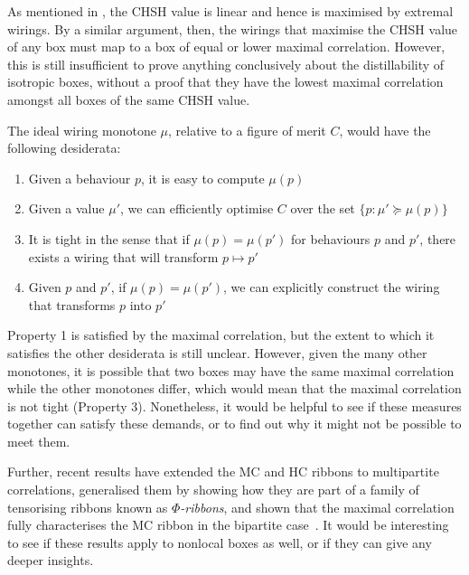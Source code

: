 \documentclass[10pt, a4paper]{article}
\numberwithin{equation}{section} %
\theoremstyle{definition}
\theoremstyle{plain}
\newcommand{\st}{\mathrel{:}} %
\newcommand{\?}{\mathrel{?}} %
\begin{document}

                        As mentioned in , the CHSH value is linear and hence is maximised by extremal wirings. By a similar argument, then, the wirings that maximise the CHSH value of any box must map to a box of equal or lower maximal correlation. However, this is still insufficient to prove anything conclusively about the distillability of isotropic boxes, without a proof that they have the lowest maximal correlation amongst all boxes of the same CHSH value.

                        The ideal wiring monotone \(\mu\), relative to a figure of merit \(C\), would have the following desiderata:
                        \begin{enumerate}
                          \item Given a behaviour \(p\), it is easy to compute \(\mu(p)\)
                          \item Given a value \(\mu'\), we can efficiently optimise \(C\) over the set \(\{ p \st \mu' \succeq \mu(p) \}\)
                          \item It is tight in the sense that if \(\mu(p) = \mu(p')\) for behaviours \(p\) and \(p'\), there exists a wiring that will transform \(p \mapsto p'\)
                          \item Given \(p\) and \(p'\), if \(\mu(p) = \mu(p')\), we can explicitly construct the wiring that transforms \(p\) into \(p'\)
                        \end{enumerate}

                        Property 1 is satisfied by the maximal correlation, but the extent to which it satisfies the other desiderata is still unclear. However, given the many other monotones, it is possible that two boxes may have the same maximal correlation while the other monotones differ, which would mean that the maximal correlation is not tight (Property 3). Nonetheless, it would be helpful to see if these measures together can satisfy these demands, or to find out why it might not be possible to meet them.

                        Further, recent results have extended the MC and HC ribbons to multipartite correlations, generalised them by showing how they are part of a family of tensorising ribbons known as \emph{\(\Phi\)-ribbons}, and shown that the maximal correlation fully characterises the MC ribbon in the bipartite case~\cite{PhiEntropies}. It would be interesting to see if these results apply to nonlocal boxes as well, or if they can give any deeper insights.
\end{document}
